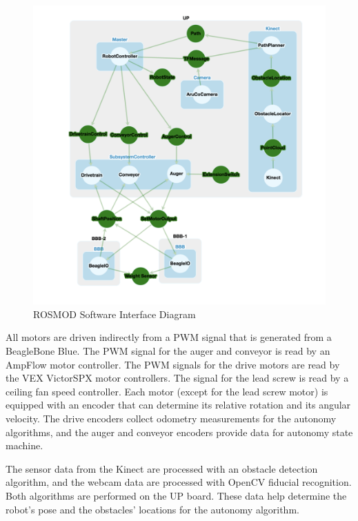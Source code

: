 \documentclass[class=article, crop=false]{standalone}
\begin{document}
	\FloatBarrier
	\begin{figure}
		\centering
		\includegraphics[width=1\linewidth]{09_Figures/programming_interfaces.png}
		\caption{ROSMOD Software Interface Diagram}
		\label{fig:software_interfaces}
	\end{figure}
	\FloatBarrier
	
	All motors are driven indirectly from a PWM signal that is generated from a BeagleBone Blue. The PWM signal for the auger and conveyor is read by an AmpFlow motor controller. The PWM signals for the drive motors are read by the VEX VictorSPX motor controllers. The signal for the lead screw is read by a ceiling fan speed controller. Each motor (except for the lead screw motor) is equipped with an encoder that can determine its relative rotation and its angular velocity. The drive encoders collect odometry measurements for the autonomy algorithms, and the auger and conveyor encoders provide data for autonomy state machine. 
	
	The sensor data from the Kinect are processed with an obstacle detection algorithm, and the webcam data are processed with OpenCV fiducial recognition. Both algorithms are performed on the UP board. These data help determine the robot’s pose and the obstacles’ locations for the autonomy algorithm. 
	
\end{document}
